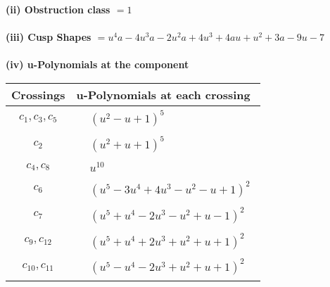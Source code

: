 \documentclass[1p]{elsarticle_modified}
\theoremstyle{definition}
\begin{document}
\flushleft \textbf{(ii) Obstruction class $= 1$}\\~\\
\flushleft \textbf{(iii) Cusp Shapes $= u^4 a-4 u^3 a-2 u^2 a+4 u^3+4 a u+u^2+3 a-9 u-7$}\\~\\
\newpage\renewcommand{\arraystretch}{1}
\flushleft \textbf{(iv) u-Polynomials at the component}\newline \\
\begin{tabular}{m{50pt}|m{274pt}}
Crossings & \hspace{64pt}u-Polynomials at each crossing \\
\hline $$\begin{aligned}c_{1},c_{3},c_{5}\end{aligned}$$&$\begin{aligned}
&(u^2- u+1)^5
\end{aligned}$\\
\hline $$\begin{aligned}c_{2}\end{aligned}$$&$\begin{aligned}
&(u^2+u+1)^5
\end{aligned}$\\
\hline $$\begin{aligned}c_{4},c_{8}\end{aligned}$$&$\begin{aligned}
&u^{10}
\end{aligned}$\\
\hline $$\begin{aligned}c_{6}\end{aligned}$$&$\begin{aligned}
&(u^5-3 u^4+4 u^3- u^2- u+1)^2
\end{aligned}$\\
\hline $$\begin{aligned}c_{7}\end{aligned}$$&$\begin{aligned}
&(u^5+u^4-2 u^3- u^2+u-1)^2
\end{aligned}$\\
\hline $$\begin{aligned}c_{9},c_{12}\end{aligned}$$&$\begin{aligned}
&(u^5+u^4+2 u^3+u^2+u+1)^2
\end{aligned}$\\
\hline $$\begin{aligned}c_{10},c_{11}\end{aligned}$$&$\begin{aligned}
&(u^5- u^4-2 u^3+u^2+u+1)^2
\end{aligned}$\\
\hline
\end{tabular}\\~\\
\end{document}
